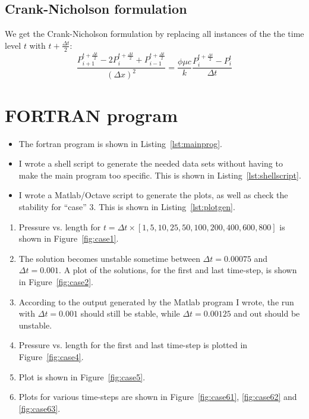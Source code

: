 \subsection{Crank-Nicholson formulation} %
\label{sub:crank_nicholson_formulation}
We get the Crank-Nicholson formulation by replacing all instances of the the time level $t$ with $t + \frac{\Delta t}{2}$:
\begin{equation}
  \frac{P_{i+1}^{t + \frac{\Delta t}{2}} - 2P_i^{t + \frac{\Delta t}{2}} + P_{i-1}^{t + \frac{\Delta t}{2}}}{(\Delta x)^2} = \frac{\phi \mu c}{k} \frac{P_i^{t + \frac{\Delta t}{2}} - P_i^t}{\Delta t}
  \label{eq:crank_nicholson_formulation}
\end{equation}


\pagebreak


\section{FORTRAN program} %
\label{sec:fortran_program}
\begin{itemize}
  \item The fortran program is shown in Listing~\ref{lst:mainprog}. 
  \item I wrote a shell script to generate the needed data sets without having to make the main program too specific. This is shown in Listing~\ref{lst:shellscript}.
  \item I wrote a Matlab/Octave script to generate the plots, as well as check the stability for ``case'' 3. This is shown in Listing~\ref{lst:plotgen}.
\end{itemize}

\begin{enumerate}
  \item Pressure vs. length for $t = \Delta t \times [1, 5, 10, 25, 50, 100, 200, 400, 600, 800]$ is shown in Figure~\ref{fig:case1}.
  \item The solution becomes unstable sometime between $\Delta t=0.00075$ and $\Delta t = 0.001$. A plot of the solutions, for the first and last time-step, is shown in Figure~\ref{fig:case2}.
  \item According to the output generated by the Matlab program I wrote, the run with $\Delta t = 0.001$ should still be stable, while $\Delta t = 0.00125$ and out should be unstable.
  \item Pressure vs. length for the first and last time-step is plotted in Figure~\ref{fig:case4}.
  \item Plot is shown in Figure~\ref{fig:case5}.
  \item Plots for various time-steps are shown in Figure~\ref{fig:case61}, \ref{fig:case62} and \ref{fig:case63}.
\end{enumerate}

